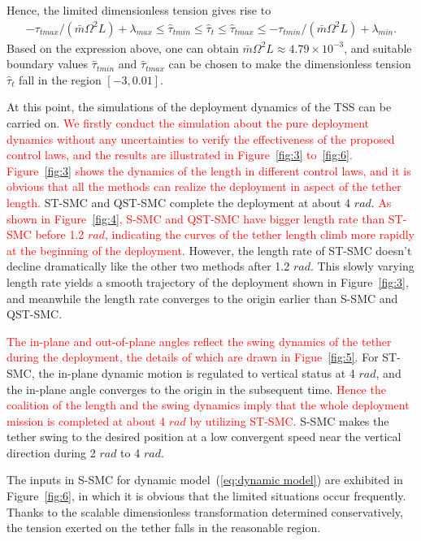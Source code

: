 \documentclass[3p]{elsarticle}
\theoremstyle{plain}
\theoremstyle{remark}
\begin{document}
Hence, the limited dimensionless tension gives rise to
\begin{align}
-\tau_{tmax}/(\bar{m}\Omega^2L)+\lambda_{max}\le\hat\tau_{tmin}\le\hat\tau_t\le\hat\tau_{tmax}\le-\tau_{tmin}/(\bar{m}\Omega^2L)+\lambda_{min}.
\end{align}
Based on the expression above, one can obtain $\bar{m}\Omega^2L\approx 4.79\times 10^{-3}$, and suitable boundary values $\hat\tau_{tmin}$ and $\hat\tau_{tmax}$ can be chosen to make the dimensionless tension $\hat\tau_t$ fall in the region $[-3,0.01]$.\par
At this point, the simulations of the deployment dynamics of the TSS can be carried on. \textcolor{red}{We firstly conduct the simulation about the pure deployment dynamics without any uncertainties to verify the effectiveness of the proposed control laws, and the results are illustrated in Figure~\ref{fig:3} to~\ref{fig:6}. Figure~\ref{fig:3} shows the dynamics of the length in different control laws, and it is obvious that all the methods can realize the deployment in aspect of the tether length.} ST-SMC and QST-SMC complete the deployment at about 4 $rad$. \textcolor{red}{As shown in Figure~\ref{fig:4}, S-SMC and QST-SMC have bigger length rate than ST-SMC before 1.2 $rad$, indicating the curves of the tether length climb more rapidly at the beginning of the deployment.} However, the length rate of ST-SMC doesn't decline dramatically like the other two methods after 1.2 $rad$. This slowly varying length rate yields a smooth trajectory of the deployment shown in Figure~\ref{fig:3}, and meanwhile the length rate converges to the origin earlier than S-SMC and QST-SMC.\par
\textcolor{red}{The in-plane and out-of-plane angles reflect the swing dynamics of the tether during the deployment, the details of which are drawn in Figue~\ref{fig:5}.} For ST-SMC, the in-plane dynamic motion is regulated to vertical status at 4 $rad$, and the in-plane angle converges to the origin in the subsequent time. \textcolor{red}{Hence the coalition of the length and the swing dynamics imply that the whole deployment mission is completed at about 4 $rad$ by utilizing ST-SMC.} S-SMC makes the tether swing to the desired position at a low convergent speed near the vertical direction during 2 $rad$ to 4 $rad$.\par
The inputs in S-SMC for dynamic model~(\ref{eq:dynamic model}) are exhibited in Figure~\ref{fig:6}, in which it is obvious that the limited situations occur frequently. Thanks to the scalable dimensionless transformation determined conservatively, the tension exerted on the tether falls in the reasonable region.\par
\end{document}
